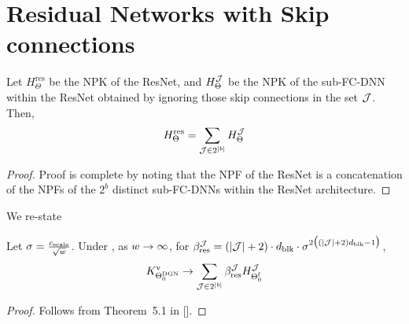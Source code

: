 \section{Residual Networks with Skip connections}

\begin{lemma}\label{lm:sumofproduct}
Let $H^{\text{res}}_{\Theta}$ be the NPK of the ResNet, and $H^{\mathcal{J}}_{\Theta}$ be the NPK of the sub-FC-DNN within the ResNet obtained by ignoring those skip connections in the set $\mathcal{J}$. Then, \begin{align*}H^{\text{res}}_{\Theta}=\sum_{\mathcal{J}\in 2^{[b]}}H^{\mathcal{J}}_{\Theta}\end{align*}
\end{lemma}
\begin{proof}
Proof is complete by noting that the NPF of the ResNet is a concatenation of the NPFs of the $2^b$ distinct sub-FC-DNNs within the ResNet architecture.
\end{proof}

We re-state 
\begin{theorem} Let $\sigma=\frac{c_{\text{scale}}}{\sqrt{w}}$. Under , as $w\rightarrow\infty$,  for $\beta_{\text{res}}^{\mathcal{J}} = (|\mathcal{J}| +2)\cdot d_{\text{blk}}\cdot \sigma^{2\big( (|\mathcal{J}|+2)d_{\text{blk}}-1\big)}$,
\begin{align*}
K^{\text{v}}_{\Theta^{\text{DGN}}_0}\rightarrow \sum_{\mathcal{J}\in 2^{[b]}}  \beta_{\text{res}}^{\mathcal{J}} H^{\mathcal{J}}_{\Theta^{\textrm{f}}_0}
\end{align*}
\end{theorem}


\begin{proof}
Follows from Theorem~5.1 in [].
\end{proof}


